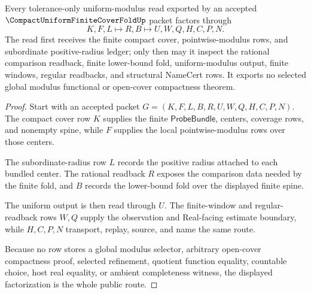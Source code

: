 \begin{theorem}
\label{thm:compact-uniform-finite-cover-fold-route}
Every tolerance-only uniform-modulus read exported by an accepted $\CompactUniformFiniteCoverFoldUp$ packet factors through
$$
K,F,L \longmapsto R,B \longmapsto U,W,Q,H,C,P,N .
$$
The read first receives the finite compact cover, pointwise-modulus rows, and subordinate positive-radius ledger; only then may it inspect the rational comparison readback, finite lower-bound fold, uniform-modulus output, finite windows, regular readbacks, and structural NameCert rows. It exports no selected global modulus functional or open-cover compactness theorem.
\end{theorem}
\begin{proof}
Start with an accepted packet $G=(K,F,L,B,R,U,W,Q,H,C,P,N)$. The compact cover row $K$ supplies the finite $\mathsf{ProbeBundle}$, centers, coverage rows, and nonempty spine, while $F$ supplies the local pointwise-modulus rows over those centers.

The subordinate-radius row $L$ records the positive radius attached to each bundled center. The rational readback $R$ exposes the comparison data needed by the finite fold, and $B$ records the lower-bound fold over the displayed finite spine.

The uniform output is then read through $U$. The finite-window and regular-readback rows $W,Q$ supply the observation and Real-facing estimate boundary, while $H,C,P,N$ transport, replay, source, and name the same route.

Because no row stores a global modulus selector, arbitrary open-cover compactness proof, selected refinement, quotient function equality, countable choice, host real equality, or ambient completeness witness, the displayed factorization is the whole public route.
\end{proof}

